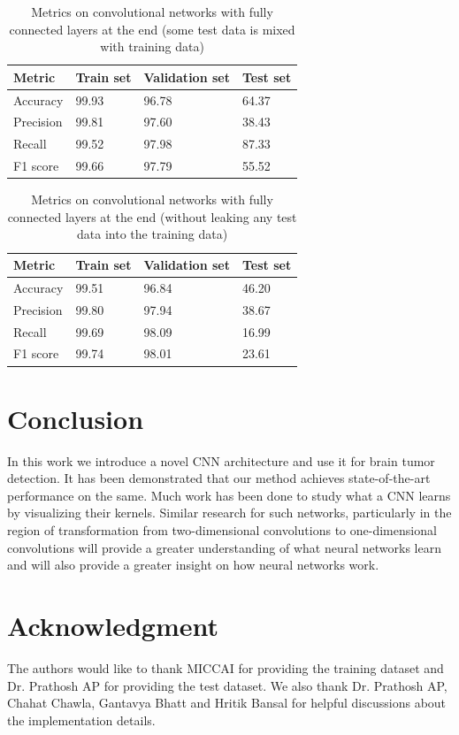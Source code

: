 \documentclass[journal]{IEEEtran}
\begin{document}
\begin{table}[H]
	\caption{Metrics on convolutional networks with fully connected layers at the end (some test data is mixed with training data)}
	\centering
	\begin{tabular}{llll}
		\toprule
		Metric & Train set & Validation set & Test set
		\\
		\midrule
		Accuracy & 99.93 & 96.78 & 64.37
		\\
		Precision & 99.81 & 97.60 & 38.43
		\\
		Recall & 99.52 & 97.98 & 87.33
		\\
		F1 score & 99.66 & 97.79 & 55.52
		\\
		\bottomrule
	\end{tabular}
\end{table}


\begin{table}[H]
	\caption{Metrics on convolutional networks with fully connected layers at the end (without leaking any test data into the training data)}
	\centering
	\begin{tabular}{llll}
		\toprule
		Metric & Train set & Validation set & Test set
		\\
		\midrule
		Accuracy & 99.51 & 96.84 & 46.20
		\\
		Precision & 99.80 & 97.94 & 38.67
		\\
		Recall & 99.69 & 98.09 & 16.99
		\\
		F1 score & 99.74 & 98.01 & 23.61
		\\
		\bottomrule
	\end{tabular}
\end{table}

\section*{Conclusion}
In this work we introduce a novel CNN architecture and use it for brain tumor detection. It has been demonstrated that our method achieves state-of-the-art performance on the same. Much work has been done to study what a CNN learns by visualizing their kernels. Similar research for such networks, particularly in the region of transformation from two-dimensional convolutions to one-dimensional convolutions will provide a greater understanding of what neural networks learn and will also provide a greater insight on how neural networks work.

\section*{Acknowledgment}
The authors would like to thank MICCAI for providing the training dataset and Dr. Prathosh AP for providing the test dataset. We also thank Dr. Prathosh AP, Chahat Chawla, Gantavya Bhatt and Hritik Bansal for helpful discussions about the implementation details.
\end{document}

